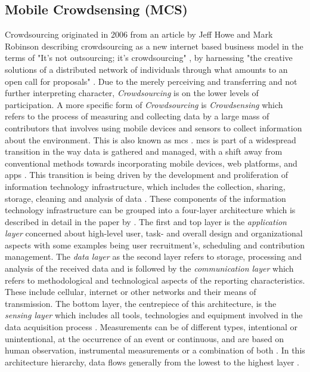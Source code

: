 \subsection{Mobile Crowdsensing (MCS)}\label{subsec:mcs} %

Crowdsourcing originated in 2006 from an article by Jeff Howe and Mark Robinson describing crowdsourcing as a new internet based business model in the terms of "It's not outsourcing; it's crowdsourcing" \autocite{howeRiseCrowdsourcing2006}, by harnessing "the creative solutions of a distributed network of individuals through what amounts to an open call for proposals" \autocite[76]{brabhamCrowdsourcingModelProblem2008}. Due to the merely perceiving and transferring and not further interpreting character, \textit{Crowdsourcing} is on the lower levels of participation. A more specific form of \textit{Crowdsourcing} is \textit{Crowdsensing} which refers to the process of measuring and collecting data by a large mass of contributors that involves using mobile devices and sensors to collect information about the environment. This is also known as \acrfull{mcs} \autocite{guoParticipatorySensingMobile2014, liuSurveyMobileCrowdsensing2018}.\newline
\acrshort{mcs} is part of a widespread transition in the way data is gathered and managed, with a shift away from conventional methods towards incorporating mobile devices, web platforms, and apps \autocite{capponiSurveyMobileCrowdsensing2019, sanllorentecapdevilaSuccessFactorsCitizen2020}. This transition is being driven by the development and proliferation of information technology infrastructure, which includes the collection, sharing, storage, cleaning and analysis of data \autocite{fraislCitizenScienceEnvironmental2022}. These components of the information technology infrastructure can be grouped into a four-layer architecture which is described in detail in the paper by \autocite{capponiSurveyMobileCrowdsensing2019}.
The first and top layer is the \textit{application layer} concerned about high-level user, task- and overall design and organizational aspects with some examples being user recruitment's, scheduling and contribution management. The \textit{data layer} as the second layer refers to storage, processing and analysis of the received data and is followed by the \textit{communication layer} which refers to methodological and technological aspects of the reporting characteristics. These include cellular, internet or other networks and their means of transmission. The bottom layer, the centrepiece of this architecture, is the \textit{sensing layer} which includes all tools, technologies and equipment involved in the data acquisition process \autocite{capponiSurveyMobileCrowdsensing2019}. Measurements can be of different types, intentional or unintentional, at the occurrence of an event or continuous, and are based on human observation, instrumental measurements or a combination of both \autocite{zhengCrowdsourcingMethodsData2018}. In this architecture hierarchy, data flows generally from the lowest to the highest layer \autocite{aceves-buenoCitizenScienceApproach2015,capponiSurveyMobileCrowdsensing2019,zhengCrowdsourcingMethodsData2018}.\newline
